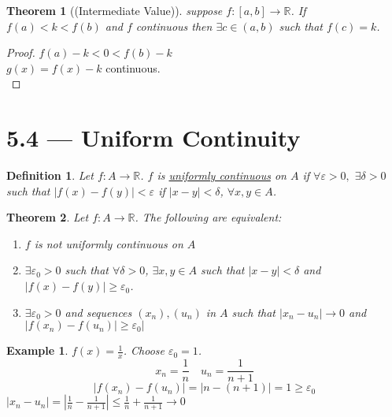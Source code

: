 \documentclass{report}
\newcommand{\R}{\mathbb{R}}  %
\newcommand{\ul}[1]{\underline{#1}}  %
\newcommand{\xn}{(x_n)}
\theoremstyle{mystyle}
\newtheorem*{theorem}{Theorem}
\newtheorem*{definition}{Definition}
\newtheorem*{example}{Example}
\theoremstyle{customtheorem}
\begin{document}
    \begin{theorem}[(Intermediate Value)]
        suppose $f:[a,b]\to\R$. If $f(a)<k<f(b)$ and $f$ continuous then $\exists c\in(a,b)$ such that $f(c)=k$.
    \end{theorem}
    \begin{proof}
        $f(a)-k<0<f(b)-k$\\
        $g(x)=f(x)-k$ continuous.\\
    \end{proof}

    \section*{5.4 --- Uniform Continuity}
    \begin{definition}
        Let $f:A\to\R$. $f$ is \ul{uniformly continuous} on $A$ if $\forall \varepsilon > 0,$ $\exists \delta > 0$ such that $\left|f(x)-f(y)\right|<\varepsilon$ if $|x-y|<\delta$, $\forall x,y\in A$.
    \end{definition}

    \begin{theorem}
        Let $f:A\to\R$. The following are equivalent:
        \begin{enumerate}[label=(\roman*)]
            \item $f$ is not uniformly continuous on $A$
            \item $\exists \varepsilon_0 > 0$ such that $\forall \delta > 0$, $\exists x,y\in A$ such that $|x-y|<\delta$ and $|f(x)-f(y)|\geq \varepsilon_0$.
            \item $\exists \varepsilon_0 > 0$ and sequences $\xn, (u_n)$ in $A$ such that $|x_n-u_n|\to 0$ and $|f\xn-f(u_n)|\geq \varepsilon_0|$
        \end{enumerate}
    \end{theorem}

    \begin{example}
        $f(x)=\frac{1}{x}$. Choose $\varepsilon_0=1$. \vspace{-1em}
        \[x_n=\frac{1}{n}\quad u_n=\frac{1}{n+1}\]
        \vspace{-1em}
        \[|f\xn-f(u_n)|=|n-(n+1)|=1\geq \varepsilon_0\]
        $|x_n-u_n|=|\frac{1}{n}-\frac{1}{n+1}|\leq \frac{1}{n}+\frac{1}{n+1}\to 0$
    \end{example}
\end{document}
